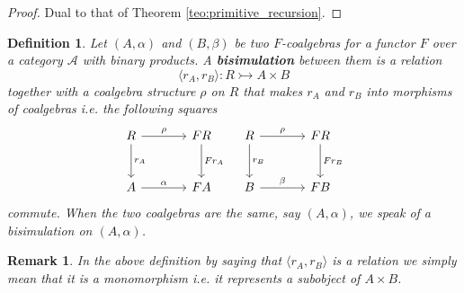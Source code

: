 \documentclass[letterpaper, 11pt, oneside]{memoir}
\theoremstyle{myteo}
\newtheorem{definition}[theorem]{Definition}
\newtheorem{remark}[theorem]{Remark}
\numberwithin{equation}{section}
\newcommand{\marginnote}[1]{\marginpar{\footnotesize #1}}
\newcommand{\A}{\mathscr{A}}
\newcommand{\intoprod}[2]{{\langle #1, #2\rangle}}
\begin{document}
\begin{proof}
  Dual to that of Theorem \ref{teo:primitive_recursion}.
\end{proof}

\begin{definition}
  \label{def:bisimulation}
  Let \((A, \alpha)\) and \((B, \beta)\) be two \(F\)-coalgebras for a functor \(F\) over a category \(\A\) with binary products.
  A \textbf{bisimulation} \marginnote{bisimulation} between them is a relation
  \begin{equation*}
    \intoprod{r_A}{r_B} : R \rightarrowtail A \times B
  \end{equation*}
  together with a coalgebra structure \(\rho\) on \(R\) that makes \(r_A\) and \(r_B\) into morphisms of coalgebras i.e. the following squares
  \begin{equation*}
    \begin{tikzcd}[sep = large]
      R \ar[r, "\rho"] \ar[d, "r_A"] & FR \ar[d, "Fr_A"] \\
      A \ar[r, "\alpha"] & FA
    \end{tikzcd}\quad
    \begin{tikzcd}[sep = large]
      R \ar[r, "\rho"] \ar[d, "r_B"] & FR \ar[d, "Fr_B"] \\
      B \ar[r, "\beta"] & FB
    \end{tikzcd}
  \end{equation*}
  commute.
  When the two coalgebras are the same, say \((A, \alpha)\), we speak of a bisimulation on \((A, \alpha)\).
\end{definition}

\begin{remark}
  In the above definition by saying that \(\intoprod{r_A}{r_B}\) is a relation we simply mean that it is a monomorphism i.e. it represents a subobject of \(A \times B\).
\end{remark}
\end{document}
